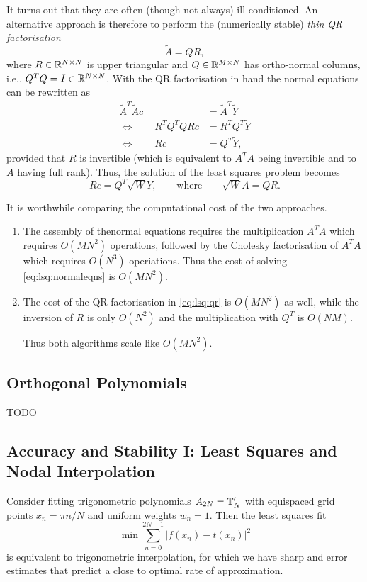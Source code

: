 It turns out that they are often (though not always) ill-conditioned. 
An alternative approach is therefore to perform the (numerically stable)
{\em thin QR factorisation}
\[
    \tilde{A} = Q R,   
\]
where $R \in \mathbb{R}^{N \times N}$ is upper triangular and  $Q \in \mathbb{R}^{M \times N}$
has ortho-normal columns, i.e., $Q^T Q = I \in \mathbb{R}^{N \times N}$. 
With the QR factorisation in hand the normal equations can be rewritten as 
\begin{align*}
    \tilde{A}^T\tilde{A} c &= \tilde{A}^T \tilde{Y} \\ 
    \Leftrightarrow \qquad 
    R^T Q^T Q R c &= R^T Q^T \tilde{Y} \\ 
    \Leftrightarrow \qquad 
    R c &= Q^T \tilde{Y},
\end{align*}
provided that $R$ is invertible (which is equivalent to $A^T A$ being invertible 
and to $A$ having full rank). Thus, the solution of the least squares problem 
becomes 
\begin{equation}
    \label{eq:lsq:qr}
    R c = Q^T \sqrt{W} Y, \qquad \text{where} \qquad 
    \sqrt{W} A = QR.
\end{equation}

It is worthwhile comparing the computational cost of the two approaches. 
\begin{enumerate}
\item The assembly of thenormal equations requires the multiplication 
$A^T A$ which requires $O(M N^2)$ operations, followed by  the 
Cholesky factorisation of $A^T A$ which requires $O(N^3)$ operiations. 
Thus the cost of solving \eqref{eq:lsq:normaleqns} is $O(M N^2)$. 
\item The cost of the QR factorisation in \eqref{eq:lsq:qr} is 
$O(M N^2)$ as well, while the inversion of $R$ is only $O(N^2)$ and the 
multiplication with $Q^T$ is $O(NM)$. 

Thus both algorithms scale like $O(M N^2)$.
\end{enumerate}


\subsection{Orthogonal Polynomials}
%
\label{sec:lsq:orthpolys}
%
\alert{TODO}

\subsection{Accuracy and Stability I: Least Squares and Nodal Interpolation}
%
Consider fitting trigonometric polynomials $A_{2N} = \mathbb{T}_N'$ with equispaced
grid points $x_n = \pi n / N$ and uniform weights $w_n = 1$. Then the
least squares fit 
\[
    \min \sum_{n = 0}^{2N-1} |f(x_n) - t(x_n)|^2 
\]
is equivalent to trigonometric interpolation, for which we have sharp and error
estimates that predict a close to optimal rate of approximation. 

